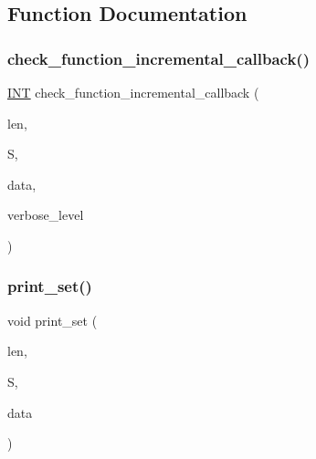 \subsection{Function Documentation}
\mbox{\label{regular__ls__generator_8_c_a87182257b04c108154aaba0054da27bf}} 
\subsubsection{\texorpdfstring{check\+\_\+function\+\_\+incremental\+\_\+callback()}{check\_function\_incremental\_callback()}}
{\footnotesize\ttfamily \mbox{\hyperlink{galois_8h_a09fddde158a3a20bd2dcadb609de11dc}{I\+NT}} check\+\_\+function\+\_\+incremental\+\_\+callback (\begin{DoxyParamCaption}\item[{\mbox{\hyperlink{galois_8h_a09fddde158a3a20bd2dcadb609de11dc}{I\+NT}}}]{len,  }\item[{\mbox{\hyperlink{galois_8h_a09fddde158a3a20bd2dcadb609de11dc}{I\+NT}} $\ast$}]{S,  }\item[{void $\ast$}]{data,  }\item[{\mbox{\hyperlink{galois_8h_a09fddde158a3a20bd2dcadb609de11dc}{I\+NT}}}]{verbose\+\_\+level }\end{DoxyParamCaption})}

\mbox{\label{regular__ls__generator_8_c_a8c1a5fc71aea7ff31d181f0103196a24}} 
\subsubsection{\texorpdfstring{print\+\_\+set()}{print\_set()}}
{\footnotesize\ttfamily void print\+\_\+set (\begin{DoxyParamCaption}\item[{\mbox{\hyperlink{galois_8h_a09fddde158a3a20bd2dcadb609de11dc}{I\+NT}}}]{len,  }\item[{\mbox{\hyperlink{galois_8h_a09fddde158a3a20bd2dcadb609de11dc}{I\+NT}} $\ast$}]{S,  }\item[{void $\ast$}]{data }\end{DoxyParamCaption})}

